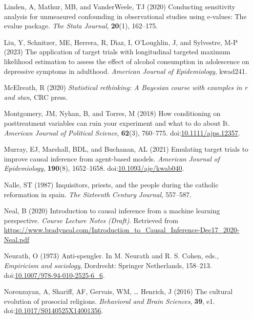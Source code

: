 \documentclass[
  single column]{article}
\newlength{\cslhangindent}
\newenvironment{CSLReferences}[2] %
 {\begin{list}{}{%
  \setlength{\itemindent}{0pt}
  \setlength{\leftmargin}{0pt}
  \setlength{\parsep}{0pt}
  \ifodd #1
   \setlength{\leftmargin}{\cslhangindent}
   \setlength{\itemindent}{-1\cslhangindent}
  \fi
  \setlength{\itemsep}{#2\baselineskip}}}
 {\end{list}}
\begin{document}
\begin{CSLReferences}{1}{0}
Linden, A, Mathur, MB, and VanderWeele, TJ (2020) Conducting sensitivity
analysis for unmeasured confounding in observational studies using
e-values: The evalue package. \emph{The Stata Journal}, \textbf{20}(1),
162--175.

Liu, Y, Schnitzer, ME, Herrera, R, Dı́az, I, O'Loughlin, J, and
Sylvestre, M-P (2023) The application of target trials with longitudinal
targeted maximum likelihood estimation to assess the effect of alcohol
consumption in adolescence on depressive symptoms in adulthood.
\emph{American Journal of Epidemiology}, kwad241.

McElreath, R (2020) \emph{Statistical rethinking: A {B}ayesian course
with examples in r and stan}, CRC press.

Montgomery, JM, Nyhan, B, and Torres, M (2018) How conditioning on
posttreatment variables can ruin your experiment and what to do about
It. \emph{American Journal of Political Science}, \textbf{62}(3),
760--775.
doi:\href{https://doi.org/10.1111/ajps.12357}{10.1111/ajps.12357}.

Murray, EJ, Marshall, BDL, and Buchanan, AL (2021) Emulating target
trials to improve causal inference from agent-based models.
\emph{American Journal of Epidemiology}, \textbf{190}(8), 1652--1658.
doi:\href{https://doi.org/10.1093/aje/kwab040}{10.1093/aje/kwab040}.

Nalle, ST (1987) Inquisitors, priests, and the people during the
catholic reformation in spain. \emph{The Sixteenth Century Journal},
557--587.

Neal, B (2020) Introduction to causal inference from a machine learning
perspective. \emph{Course Lecture Notes (Draft)}. Retrieved from
\url{https://www.bradyneal.com/Introduction_to_Causal_Inference-Dec17_2020-Neal.pdf}

Neurath, O (1973) Anti-spengler. In M. Neurath and R. S. Cohen, eds.,
\emph{Empiricism and sociology}, Dordrecht: Springer Netherlands,
158--213.
doi:\href{https://doi.org/10.1007/978-94-010-2525-6_6}{10.1007/978-94-010-2525-6\_6}.

Norenzayan, A, Shariff, AF, Gervais, WM, \ldots{} Henrich, J (2016) The
cultural evolution of prosocial religions. \emph{Behavioral and Brain
Sciences}, \textbf{39}, e1.
doi:\href{https://doi.org/10.1017/S0140525X14001356}{10.1017/S0140525X14001356}.


\end{CSLReferences}
\end{document}
